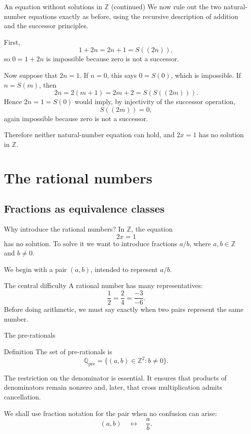 \documentclass[aspectratio=169,11pt]{beamer}
\newcommand{\suc}[1]{S(#1)}
\newcommand{\Z}{\mathbb Z}
\newcommand{\Q}{\mathbb Q}
\begin{document}
\begin{frame}{An equation without solutions in \(\Z\) (continued)}
  We now rule out the two natural-number equations exactly as before, using
  the recursive description of addition and the successor principles.

  First,
  \[
    1+2n=2n+1=\suc{(2n)},
  \]
  so \(0=1+2n\) is impossible because zero is not a successor.

  Now suppose that \(2n=1\).  If \(n=0\), this says \(0=\suc0\), which is
  impossible.  If \(n=\suc m\), then
  \[
    2n=2(m+1)=2m+2=\suc{\suc{(2m)}}.
  \]
  Hence \(2n=1=\suc0\) would imply, by injectivity of the successor
  operation,
  \[
    \suc{(2m)}=0,
  \]
  again impossible because zero is not a successor.

  Therefore neither natural-number equation can hold, and \(2x=1\) has no
  solution in \(\Z\).
\end{frame}

\section{The rational numbers}

\subsection{Fractions as equivalence classes}

\begin{frame}{Why introduce the rational numbers?}
  In \(\Z\), the equation
  \[
    2x=1
  \]
  has no solution.  To solve it we want to introduce fractions \(a/b\), where
  \(a,b\in\Z\) and \(b\ne0\).

  We begin with a pair \((a,b)\), intended to represent \(a/b\).

  \begin{alertblock}{The central difficulty}
    A rational number has many representatives:
    \[
      \frac12=\frac24=\frac{-3}{-6}.
    \]
    Before doing arithmetic, we must say exactly when two pairs represent the
    same number.
  \end{alertblock}
\end{frame}

\begin{frame}{The pre-rationals}
  \begin{block}{Definition}
    The set of \alert{pre-rationals} is
    \[
      \Q_{\mathrm{pre}}
        =\{(a,b)\in\Z^2:b\ne0\}.
    \]
  \end{block}

  The restriction on the denominator is essential.  It ensures that products
  of denominators remain nonzero and, later, that cross multiplication admits
  cancellation.

  We shall use fraction notation for the pair when no confusion can arise:
  \[
    (a,b)\quad\longleftrightarrow\quad \frac ab.
  \]
\end{frame}
\end{document}
